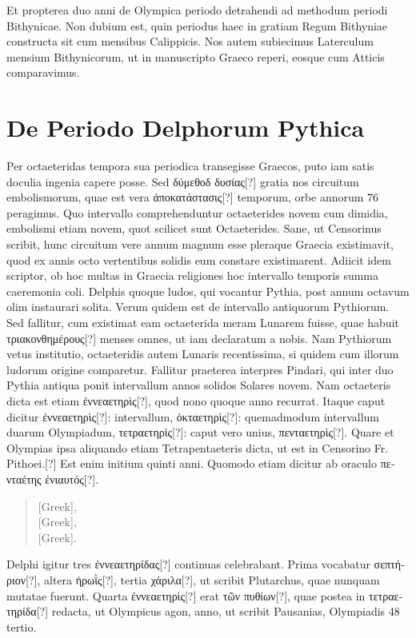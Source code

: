 Et propterea duo anni de Olympica periodo detrahendi ad
methodum periodi Bithynicae.
Non dubium est, quin periodus haec
in gratiam Regum Bithyniae constructa sit cum mensibus Calippicis.
Nos autem subiecimus Laterculum mensium Bithynicorum, ut in
manuscripto Graeco reperi, eosque cum Atticis comparavimus.

\section{De Periodo Delphorum Pythica}

Per octaeteridas tempora sua periodica transegisse Graecos, puto
iam satis doculia ingenia capere posse.
Sed \textgreek{δὐμεθοδ δυσίας[?]} gratia
nos circuitum embolismorum, quae est vera
 \textgreek{ἀποκατάστασις[?]} temporum,
orbe annorum 76 peragimus.
Quo intervallo comprehenduntur
octaeterides novem cum dimidia, embolismi etiam novem, quot scilicet
sunt Octaeterides.
Sane, ut Censorinus scribit, hunc circuitum
vere annum magnum esse pleraque Graecia existimavit, quod ex annis
octo vertentibus solidis eum constare existimarent.
Adiicit idem
scriptor, ob hoc multas in Graecia religiones hoc intervallo temporis
summa caeremonia coli.
Delphis quoque ludos, qui vocantur Pythia,
post annum octavum olim instaurari solita.
Verum quidem est de intervallo
antiquorum Pythiorum.
Sed fallitur, cum existimat eam octaeterida
meram Lunarem fuisse, quae habuit \textgreek{τριακονθημέρους[?]} menses omnes,
ut iam declaratum a nobis.
Nam Pythiorum vetus institutio,
octaeteridis autem Lunaris recentissima, si quidem cum illorum ludorum
origine comparetur.
Fallitur praeterea interpres Pindari, qui
inter duo Pythia antiqua ponit intervallum annos solidos Solares
novem.
Nam octaeteris dicta est etiam \textgreek{ἐννεαετηρὶς[?]},
 quod nono quoque
anno recurrat.
Itaque caput dicitur \textgreek{ἐννεαετηρὶς[?]}: intervallum,
\textgreek{ὀκταετηρὶς[?]}: quemadmodum intervallum duarum Olympiadum,
 \textgreek{τετραετηρὶς[?]}:
caput vero unius, \textgreek{πενταετηρὶς[?]}.
Quare et Olympias ipsa
aliquando etiam Tetrapentaeteris dicta, ut est in Censorino Fr. Pithoei.[?]
Est enim initium quinti anni.
Quomodo etiam dicitur ab oraculo \textgreek{πενταέτης ἐνιαυτός[?]}.
\begin{verse}
\textgreek{[Greek]},\\
\textgreek{[Greek]},\\
\textgreek{[Greek]}.
\end{verse}
Delphi igitur tres \textgreek{ἐννεαετηρίδας[?]} continuas celebrabant.
Prima vocabatur
\textgreek{σεπτήριον[?]}, altera \textgreek{ἡρωῒς[?]},
 tertia \textgreek{χάριλα[?]}, ut scribit Plutarchus, quae
nunquam mutatae fuerunt.
Quarta \textgreek{ἐννεαετηρὶς[?]} erat \textgreek{τῶν πυθίων[?]}, quae
postea in \textgreek{τετραετηρίδα[?]} redacta,
 ut Olympicus agon, anno, ut scribit
Pausanias, Olympiadis 48 tertio.

